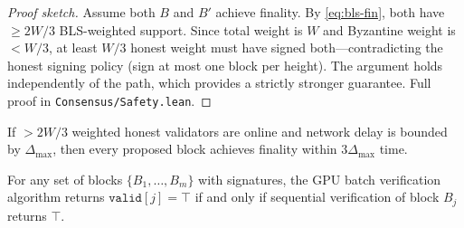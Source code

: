 \begin{proof}[Proof sketch]
Assume both $B$ and $B'$ achieve finality. By \eqref{eq:bls-fin}, both have $\geq 2W/3$ BLS-weighted support. Since total weight is $W$ and Byzantine weight is $< W/3$, at least $W/3$ honest weight must have signed both---contradicting the honest signing policy (sign at most one block per height). The argument holds independently of the \Ringtail{} path, which provides a strictly stronger guarantee. Full proof in \texttt{Consensus/Safety.lean}.
\end{proof}

\begin{theorem}
\label{thm:liveness}
If $> 2W/3$ weighted honest validators are online and network delay is bounded by $\Delta_{\max}$, then every proposed block achieves \Quasar{} finality within $3\Delta_{\max}$ time.
\end{theorem}

\begin{theorem}
\label{thm:batch}
For any set of blocks $\{B_1, \ldots, B_m\}$ with signatures, the GPU batch verification algorithm returns $\texttt{valid}[j] = \top$ if and only if sequential verification of block $B_j$ returns $\top$.
\end{theorem}

